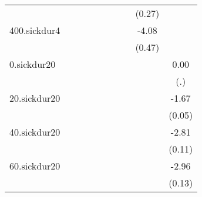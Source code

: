\documentclass{article}
\begin{document}
{\begin{tabular}{l*{9}{c}}
            &                     &                     &                     &                     &                     &                     &                     &      (0.27)         &                     \\
[1em]
400.sickdur4&                     &                     &                     &                     &                     &                     &                     &       -4.08\sym{***}&                     \\
            &                     &                     &                     &                     &                     &                     &                     &      (0.47)         &                     \\
[1em]
0.sickdur20 &                     &                     &                     &                     &                     &                     &                     &                     &        0.00         \\
            &                     &                     &                     &                     &                     &                     &                     &                     &         (.)         \\
[1em]
20.sickdur20&                     &                     &                     &                     &                     &                     &                     &                     &       -1.67\sym{***}\\
            &                     &                     &                     &                     &                     &                     &                     &                     &      (0.05)         \\
[1em]
40.sickdur20&                     &                     &                     &                     &                     &                     &                     &                     &       -2.81\sym{***}\\
            &                     &                     &                     &                     &                     &                     &                     &                     &      (0.11)         \\
[1em]
60.sickdur20&                     &                     &                     &                     &                     &                     &                     &                     &       -2.96\sym{***}\\
            &                     &                     &                     &                     &                     &                     &                     &                     &      (0.13)         \\

\end{tabular}}
\end{document}
